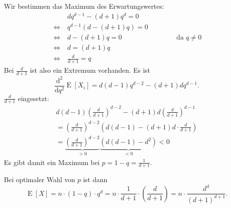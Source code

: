 \documentclass[a4paper]{scrartcl}
\newcommand{\gdw}{\ \Leftrightarrow\ }
\DeclareMathOperator{\E}{E}
\begin{document}
\begin{enumerate}[label=\bfseries \arabic*.]
\begin{enumerate}
        Wir bestimmen das Maximum des Erwartungswertes:
        \begin{equation*}
            \begin{aligned}
                & dq^{d-1} -(d+1)q^d = 0 \\
                \gdw& q^{d-1}(d-(d+1)q) = 0 \\
                \gdw& d-(d+1)q = 0 \qquad\qquad\qquad\qquad \text{da } q \neq 0 \\
                \gdw& d = (d+1)q \\
                \gdw& \frac{d}{d+1} = q
            \end{aligned}
        \end{equation*}
        Bei $\frac{d}{d+1}$ ist also ein Extremum vorhanden.
        Es ist
        \begin{equation*}
            \frac{\mathrm{d}^2}{\mathrm{d}q^2} \E[X_i]
            = d(d-1)q^{d-2} - (d+1)dq^{d-1}.
        \end{equation*}
        $\frac{d}{d+1}$ eingesetzt:
        \begin{equation*}
            \begin{gathered}
                d(d-1)\left(\frac{d}{d+1}\right)^{d-2}
                - (d+1)d\left(\frac{d}{d+1}\right)^{d-1} \\
                 = \left(\frac{d}{d+1}\right)^{d-2}
                 \left(d(d-1) - (d+1)d \cdot \frac{d}{d+1}\right) \\
                 = \underbrace{\left(\frac{d}{d+1}\right)^{d-2}}_{> 0}
                 \underbrace{(d(d-1) - d^2)}_{< 0} < 0
            \end{gathered}
        \end{equation*}
        Es gibt damit ein Maximum bei $p = 1-q = \frac{1}{d+1}$.

        Bei optimaler Wahl von $p$ ist dann
        \begin{equation*}
            \E[X] = n \cdot (1-q) \cdot q^d
            = n \cdot \frac{1}{d+1} \cdot \left(\frac{d}{d+1}\right)
            = n \cdot \frac{d^d}{(d+1)^{d+1}}.
        \end{equation*}


\end{enumerate}


\end{enumerate}
\end{document}

